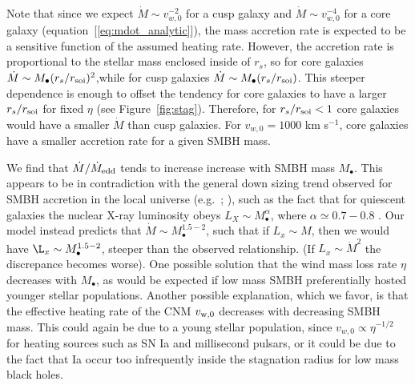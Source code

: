 \documentclass[usenatbib,fleqn]{mn2e}
\newcommand{\Mdot}{\dot{M}}
\newcommand{\rs}{r_s}
\newcommand{\Mbh}[1][]{M_{\bullet#1}}
\newcommand{\soi}{\rm soi}
\newcommand{\rsoi}{r_{\soi}}
\newcommand{\vwO}{v_{w,0}}
\begin{document}
Note that since we expect $\dot{M}\sim\vwO^{-2}$ for a cusp galaxy and $\dot{M}\sim\vwO^{-4}$ for a core galaxy (equation~[\ref{eq:mdot_analytic}]), the mass accretion rate is expected to be a sensitive function of the assumed heating rate.  However,  the accretion rate is proportional to the stellar mass enclosed inside of $\rs$, so for core galaxies $\dot{M}\sim \Mbh (\rs/\rsoi)^{2}$,while for cusp galaxies $\dot{M}\sim \Mbh (\rs/\rsoi)$.  This steeper dependence is enough to offset the tendency for core galaxies to have a larger $\rs/\rsoi$ for fixed $\eta$ (see Figure~\ref{fig:stag}). Therefore, for $\rs/\rsoi<1$ core galaxies would have a smaller $\dot{M}$ than cusp galaxies.  For $\vwO=1000$ km s$^{-1}$, core galaxies have a smaller accretion rate for a given SMBH mass.

We find that $\dot{M}/\dot{M}_{\rm edd}$ tends to increase increase with SMBH mass $M_{\bullet}$.  This appears to be in contradiction with the general down sizing trend observed for SMBH accretion in the local universe (e.g.~\citealt{Heckman+04}; \citealt{Gallo+08}), such as the fact that for quiescent galaxies the nuclear X-ray luminosity obeys $L_X \sim \Mbh^\alpha$, where $\alpha\simeq 0.7-0.8$ \citep{MillerGallo+:2014a}.  Our model instead predicts that $\Mdot \sim
\Mbh^{1.5-2}$, such that if $L_x\sim M$, then we would have $\L_x \sim \Mbh^{1.5-2}$, steeper than the observed relationship. (If $L_x \sim \Mdot^2$ the discrepance becomes worse).  One possible solution that the wind mass loss rate $\eta$ decreases with $\Mbh$, as would be expected if low mass SMBH preferentially hosted younger stellar populations.  Another possible explanation, which we favor, is that the effective heating rate of the CNM $v_{\rm w,0}$ decreases with decreasing SMBH mass.  This could again be due to a young stellar population, since $v_{w,0} \propto \eta^{-1/2}$ for heating sources such as SN Ia and millisecond pulsars, or it could be due to the fact that Ia occur too infrequently inside the stagnation radius for low mass black holes.  
\end{document}
